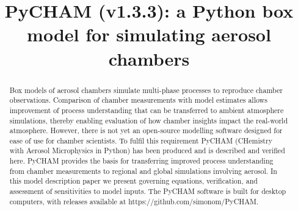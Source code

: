 \documentclass[gmd, manuscript]{copernicus}
\begin{document}
\title{PyCHAM (v1.3.3): a Python box model for simulating aerosol chambers}















\received{}
\pubdiscuss{} %
\revised{}
\accepted{}
\published{}




\maketitle



\begin{abstract}
Box models of aerosol chambers simulate multi-phase processes to reproduce chamber observations.  Comparison of chamber measurements with model estimates allows improvement of process understanding that can be transferred to ambient atmosphere simulations, thereby enabling evaluation of how chamber insights impact the real-world atmosphere.  However, there is not yet an open-source modelling software designed for ease of use for chamber scientists.  To fulfil this requirement PyCHAM (CHemistry with Aerosol Microphysics in Python) has been produced and is described and verified here.  PyCHAM provides the basis for transferring improved process understanding from chamber measurements to regional and global simulations involving aerosol.  In this model description paper we present governing equations, verification, and assessment of sensitivities to model inputs.  The PyCHAM software is built for desktop computers, with releases available at https://github.com/simonom/PyCHAM.

\end{abstract}
\end{document}
